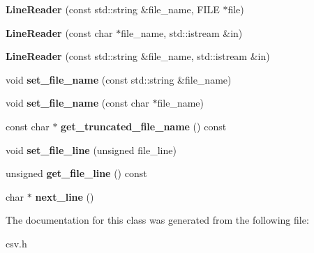 \begin{DoxyCompactItemize}
\item 
{\bfseries Line\+Reader} (const std\+::string \&file\+\_\+name, F\+I\+LE $\ast$file)\label{classio_1_1_line_reader_a93fa2e3ae98b0e7a7391714d6395c552}

\item 
{\bfseries Line\+Reader} (const char $\ast$file\+\_\+name, std\+::istream \&in)\label{classio_1_1_line_reader_a301c08eb9ca5d3fdccf4e9a8e5ac82f8}

\item 
{\bfseries Line\+Reader} (const std\+::string \&file\+\_\+name, std\+::istream \&in)\label{classio_1_1_line_reader_a3eacf4d1539a24122c6897fce4e72f06}

\item 
void {\bfseries set\+\_\+file\+\_\+name} (const std\+::string \&file\+\_\+name)\label{classio_1_1_line_reader_a1a0763d491dec16cebc33134e965dfee}

\item 
void {\bfseries set\+\_\+file\+\_\+name} (const char $\ast$file\+\_\+name)\label{classio_1_1_line_reader_a81c56ac68497da5ec874333ce063fd83}

\item 
const char $\ast$ {\bfseries get\+\_\+truncated\+\_\+file\+\_\+name} () const \label{classio_1_1_line_reader_a4a0ea19065c0092e7fc68c4ccbd815b1}

\item 
void {\bfseries set\+\_\+file\+\_\+line} (unsigned file\+\_\+line)\label{classio_1_1_line_reader_a581b55d4ced6adb964de50fa8ac6eb08}

\item 
unsigned {\bfseries get\+\_\+file\+\_\+line} () const \label{classio_1_1_line_reader_ae043da5b943a08601246c7e3420fd126}

\item 
char $\ast$ {\bfseries next\+\_\+line} ()\label{classio_1_1_line_reader_a97f4e0129611d9da2b8c966ffe670be5}

\end{DoxyCompactItemize}


The documentation for this class was generated from the following file\+:\begin{DoxyCompactItemize}
\item 
csv.\+h\end{DoxyCompactItemize}
